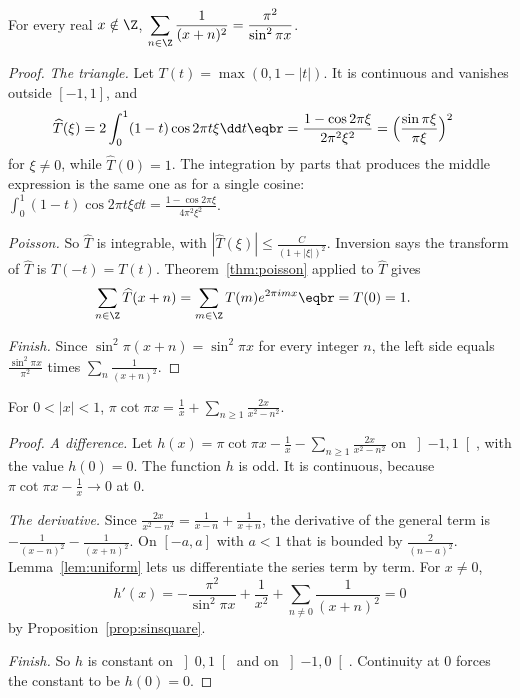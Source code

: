 \begin{proposition}\label{prop:sinsquare}
For every real $x\notin\Z$, $\displaystyle\sum_{n\in\Z}\frac1{(x+n)^2}=\frac{\pi^2}{\sin^2\pi x}$.
\end{proposition}
\begin{proof}
\emph{The triangle.} Let $T(t)=\max(0,1-|t|)$. It is continuous and vanishes outside $[-1,1]$, and
\[
\begin{aligned}\widehat T(\xi)&=2\int_0^1(1-t)\cos2\pi t\xi\dd t\eqbr=\frac{1-\cos2\pi\xi}{2\pi^2\xi^2}=\Bigl(\frac{\sin\pi\xi}{\pi\xi}\Bigr)^2\end{aligned}
\]
for $\xi\ne0$, while $\widehat T(0)=1$. The integration by parts that produces the middle expression is the same one as for a single cosine: $\int_0^1(1-t)\cos2\pi t\xi\dd t=\frac{1-\cos2\pi\xi}{4\pi^2\xi^2}$.

\emph{Poisson.} So $\widehat T$ is integrable, with $|\widehat T(\xi)|\le\frac C{(1+|\xi|)^2}$. Inversion says the transform of $\widehat T$ is $T(-t)=T(t)$. Theorem~\ref{thm:poisson} applied to $\widehat T$ gives
\[
\begin{aligned}\sum_{n\in\Z}\widehat T(x+n)&=\sum_{m\in\Z}T(m)e^{2\pi imx}\eqbr=T(0)=1.\end{aligned}
\]

\emph{Finish.} Since $\sin^2\pi(x+n)=\sin^2\pi x$ for every integer $n$, the left side equals $\frac{\sin^2\pi x}{\pi^2}$ times $\sum_n\frac1{(x+n)^2}$.
\end{proof}

\begin{corollary}\label{cor:cotagain}
For $0<|x|<1$, $\pi\cot\pi x=\frac1x+\sum_{n\ge1}\frac{2x}{x^2-n^2}$.
\end{corollary}
\begin{proof}
\emph{A difference.} Let $h(x)=\pi\cot\pi x-\frac1x-\sum_{n\ge1}\frac{2x}{x^2-n^2}$ on $\left]-1,1\right[$, with the value $h(0)=0$. The function $h$ is odd. It is continuous, because $\pi\cot\pi x-\frac1x\to0$ at $0$.

\emph{The derivative.} Since $\frac{2x}{x^2-n^2}=\frac1{x-n}+\frac1{x+n}$, the derivative of the general term is $-\frac1{(x-n)^2}-\frac1{(x+n)^2}$. On $[-a,a]$ with $a<1$ that is bounded by $\frac2{(n-a)^2}$. Lemma~\ref{lem:uniform} lets us differentiate the series term by term. For $x\ne0$,
\[
h'(x)=-\frac{\pi^2}{\sin^2\pi x}+\frac1{x^2}+\sum_{n\ne0}\frac1{(x+n)^2}=0
\]
by Proposition~\ref{prop:sinsquare}.

\emph{Finish.} So $h$ is constant on $\left]0,1\right[$ and on $\left]-1,0\right[$. Continuity at $0$ forces the constant to be $h(0)=0$.
\end{proof}

